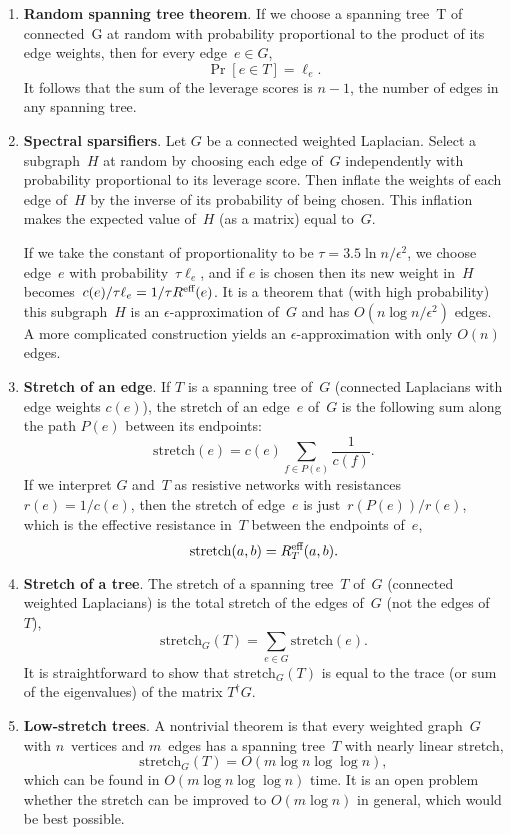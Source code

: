 \documentclass[11pt]{article}
\newcommand{\stretchh}{\mbox{stretch}}
\newcommand{\Reff}{R^{\mbox{\scriptsize eff}}}  %
\newcommand{\pinv}{^{\dagger}}          %
\begin{document}
\begin{enumerate}
\item{\bf Random spanning tree theorem}.\label{rtree}
If we choose a spanning tree~T of connected~G at random with probability
proportional to the product of its edge weights, 
then for every edge~$e\in G$,
$$\Pr[e\in T] = \ell_e.$$
It follows that the sum of the leverage scores is $n-1$,
the number of edges in any spanning tree.

\item{\bf Spectral sparsifiers}.
Let $G$ be a connected weighted Laplacian.
Select a subgraph~$H$ at random by choosing each edge
of~$G$ independently with probability proportional to its leverage score.
Then inflate the weights of each edge of~$H$ 
by the inverse of its probability of being chosen.
This inflation makes the expected value of~$H$ (as a matrix) equal to~$G$.

If we take the constant of proportionality to be $\tau=3.5\ln n/\epsilon^2$,
we choose edge~$e$ with probability~$\tau\ell_e$, 
and if $e$ is chosen then its new weight in~$H$ 
becomes~$c(e)/\tau\ell_e = 1/\tau\Reff(e)$.
It is a theorem that (with high probability) this subgraph~$H$ 
is an $\epsilon$-approximation of~$G$ and has $O(n\log n/\epsilon^2)$ edges.
A more complicated construction yields an $\epsilon$-approximation
with only $O(n)$ edges.

\item{\bf Stretch of an edge}.
If $T$ is a spanning tree of~$G$ 
(connected Laplacians with edge weights $c(e)$),
the stretch of an edge~$e$ of~$G$ is the following sum along the
path $P(e)$ between its endpoints:
$$\stretchh(e) = c(e)\sum_{f\in P(e)}\frac{1}{c(f)}.$$
If we interpret $G$ and~$T$ as resistive networks
with resistances $r(e) = 1/c(e)$, 
then the stretch of edge~$e$ is just~$r(P(e))/r(e)$,
which is the effective resistance in~$T$ between the endpoints of~$e$,
$$\stretchh(a,b) = \Reff_T(a,b).$$

\item{\bf Stretch of a tree}.
The stretch of a spanning tree~$T$ of~$G$ 
(connected weighted Laplacians)
is the total stretch of the edges of~$G$ (not the edges of~$T$),
$$\stretchh_G(T)=\sum_{e\in G}\stretchh(e).$$
It is straightforward to show that $\stretchh_G(T)$ is equal to
the trace (or sum of the eigenvalues) of the matrix $T\pinv G$.

\item{\bf Low-stretch trees}.
A nontrivial theorem is that every weighted graph~$G$ 
with $n$~vertices and $m$~edges
has a spanning tree~$T$ with nearly linear stretch,
$$\stretchh_G(T)=O(m\log n\log\log n),$$
which can be found in $O(m\log n\log\log n)$ time.
It is an open problem whether the stretch can be improved
to $O(m\log n)$ in general, which would be best possible.

\end{enumerate}
\end{document}
